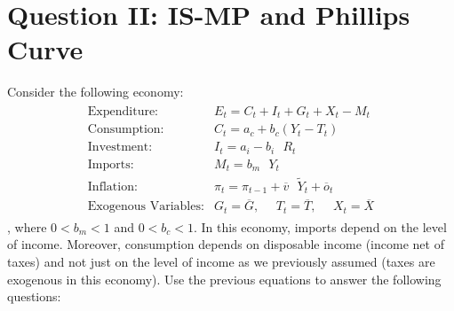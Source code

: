 \documentclass[letterpaper,12pt]{article}
\theoremstyle{dotlessS}
\begin{document}
\section*{Question II: IS-MP and Phillips Curve}
Consider the following economy:
\begin{eqnarray*}
\begin{array}{ll}
\text{Expenditure:} & E_t=C_t+I_t+G_t+X_t-M_t \\[1.4ex]
\text{Consumption:} &C_t=a_c+b_c (Y_t-T_t) \\[1.4ex]
\text{Investment:} & I_t=a_i -b_i \: \: \: R_t \\[1.4ex]
\text{Imports:} & M_t=b_m \: \: \: Y_t  \\[1.4ex]
\text{Inflation:} & \pi_t=\pi_{t-1}+\overline{v} \: \: \: \widetilde{Y}_t+\overline{o}_t  \\[1.4ex]
\text{Exogenous Variables:} & G_t=\overline{G}, \: \: \: \: \: \: T_t=\overline{T}, \: \: \: \: \: \: X_t=\overline{X}
\end{array}
\end{eqnarray*}
, where $0<b_m<1$ and $0<b_c<1$. In this economy, imports depend on the level of income. Moreover, consumption depends on disposable income (income net of taxes) and not just on the level of income as we previously assumed (taxes are exogenous in this economy). Use the previous equations to answer the following questions:
\end{document}
